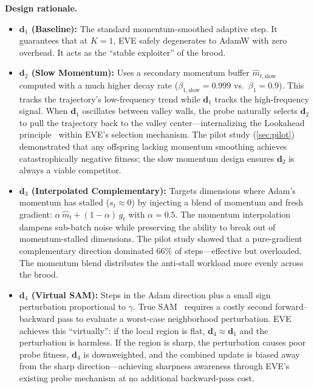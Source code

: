 \documentclass[12pt]{article}
\newcommand{\notebox}[1]{%
  \begin{tcolorbox}[notestyle]
    #1
  \end{tcolorbox}
}
\begin{document}
\notebox{%
\textbf{Design rationale.}
\begin{itemize}[leftmargin=1.6em, itemsep=4pt]
  \item \textbf{$\mathbf{d}_1$ (Baseline):} The standard
    momentum-smoothed adaptive step.
    It guarantees that at $K = 1$, EVE safely degenerates to AdamW
    with zero overhead.
    It acts as the ``stable exploiter'' of the brood.
  \item \textbf{$\mathbf{d}_2$ (Slow Momentum):}
    Uses a secondary momentum buffer $\hat{m}_{t,\mathrm{slow}}$
    computed with a much higher decay rate
    ($\beta_{1,\mathrm{slow}} = 0.999$ vs.\ $\beta_1 = 0.9$).
    This tracks the trajectory's low-frequency trend while
    $\mathbf{d}_1$ tracks the high-frequency signal.
    When $\mathbf{d}_1$ oscillates between valley walls, the probe
    naturally selects $\mathbf{d}_2$ to pull the trajectory back
    to the valley center---internalizing the Lookahead
    principle~\cite{zhang2019lookahead} within EVE's selection
    mechanism.
    The pilot study (\cref{sec:pilot}) demonstrated that any offspring
    lacking momentum smoothing achieves catastrophically negative
    fitness; the slow momentum design ensures $\mathbf{d}_2$ is
    always a viable competitor.
  \item \textbf{$\mathbf{d}_3$ (Interpolated Complementary):}
    Targets dimensions where Adam's momentum has stalled
    ($s_t \approx 0$) by injecting a blend of momentum and fresh
    gradient: $\alpha\,\hat{m}_t + (1 - \alpha)\,g_t$ with
    $\alpha = 0.5$.
    The momentum interpolation dampens sub-batch noise while
    preserving the ability to break out of momentum-stalled
    dimensions.
    The pilot study showed that a pure-gradient complementary
    direction dominated 66\% of steps---effective but overloaded.
    The momentum blend distributes the anti-stall workload
    more evenly across the brood.
  \item \textbf{$\mathbf{d}_4$ (Virtual SAM):}
    Steps in the Adam direction plus a small sign perturbation
    proportional to $\gamma$.
    True SAM~\cite{foret2021sharpnessaware} requires a costly
    second forward--backward pass to evaluate a worst-case
    neighborhood perturbation.
    EVE achieves this ``virtually'': if the local region is flat,
    $\mathbf{d}_4 \approx \mathbf{d}_1$ and the perturbation is
    harmless.
    If the region is sharp, the perturbation causes poor probe
    fitness, $\mathbf{d}_4$ is downweighted, and the combined
    update is biased away from the sharp direction---achieving
    sharpness awareness through EVE's existing probe mechanism
    at no additional backward-pass cost.
\end{itemize}
}
\end{document}
